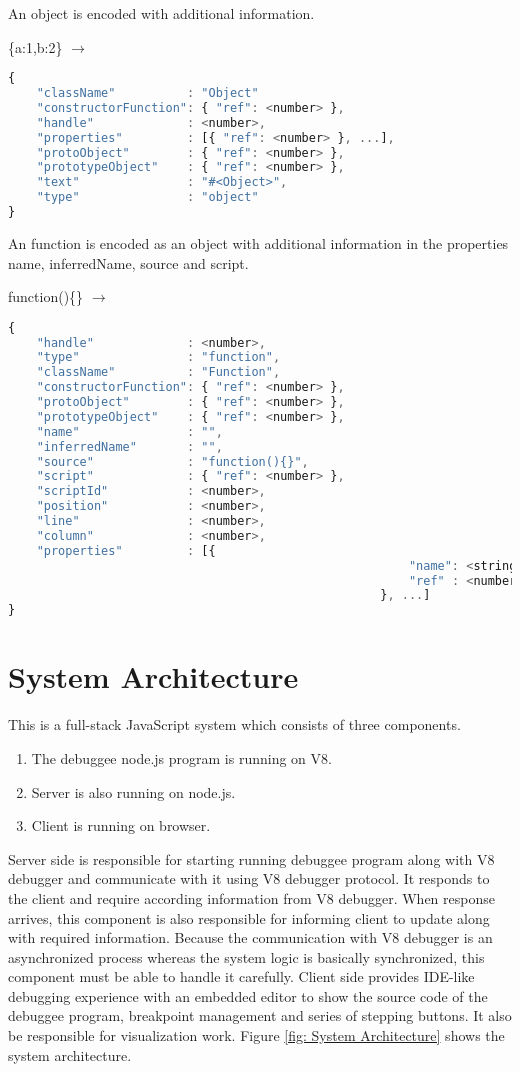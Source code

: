 An object is encoded with additional information.

\{a:1,b:2\} \(\rightarrow\)
\begin{lstlisting}[language=JavaScript]
{
	"className"          : "Object"
	"constructorFunction": { "ref": <number> },
	"handle"             : <number>,
	"properties"         : [{ "ref": <number> }, ...],
	"protoObject"        : { "ref": <number> },
	"prototypeObject"    : { "ref": <number> },
	"text"               : "#<Object>",
	"type"               : "object"
}
\end{lstlisting}

An function is encoded as an object with additional information in the properties name, inferredName, source and script.

function()\{\} \(\rightarrow\)
\begin{lstlisting}[language=JavaScript]
{
	"handle"             : <number>,
	"type"               : "function",
	"className"          : "Function",
	"constructorFunction": { "ref": <number> },
	"protoObject"        : { "ref": <number> },
	"prototypeObject"    : { "ref": <number> },
	"name"               : "",
	"inferredName"       : "",
	"source"             : "function(){}",
	"script"             : { "ref": <number> },
	"scriptId"           : <number>,
	"position"           : <number>,
	"line"               : <number>,
	"column"             : <number>,
	"properties"         : [{
														"name": <string>,
														"ref" : <number>
													}, ...]
}
\end{lstlisting}

\section {System Architecture}
This is a full-stack JavaScript system which consists of three components.

\begin{enumerate}
	\item The debuggee node.js program is running on V8.
	\item Server is also running on node.js.
	\item Client is running on browser. 
\end{enumerate}

Server side is responsible for starting running debuggee program along with V8 debugger and communicate with it using V8 debugger protocol. It responds to the client and require according information from V8 debugger. When response arrives, this component is also responsible for informing client to update along with required information. Because the communication with V8 debugger is an asynchronized process whereas the system logic is basically synchronized, this component must be able to handle it carefully. Client side provides IDE-like debugging experience with an embedded editor to show the source code of the debuggee program, breakpoint management and series of stepping buttons. It also be responsible for visualization work. Figure \ref{fig: System Architecture} shows the system architecture.

